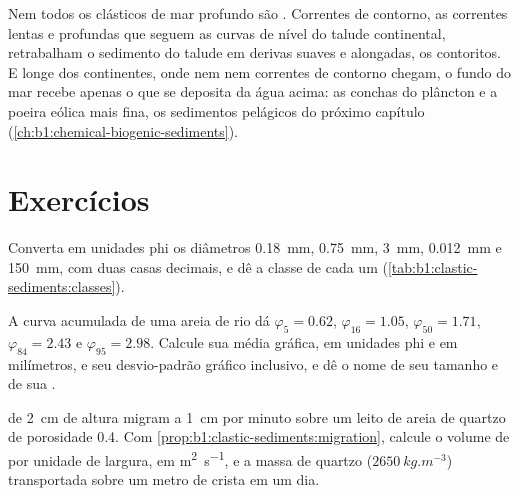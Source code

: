Nem todos os clásticos de mar profundo são . Correntes de contorno, as correntes lentas e profundas que seguem as curvas de nível do talude continental, retrabalham o sedimento do talude em derivas suaves e alongadas, os contoritos. E longe dos continentes, onde nem  nem correntes de contorno chegam, o fundo do mar recebe apenas o que se deposita da água acima: as conchas do plâncton e a poeira eólica mais fina, os sedimentos pelágicos do próximo capítulo (\cref{ch:b1:chemical-biogenic-sediments}).

\section{Exercícios}

\begin{exercise}[$\star$]\label{exo:b1:clastic-sediments:1}
Converta em unidades phi os diâmetros \qty{0.18}{mm}, \qty{0.75}{mm}, \qty{3}{mm}, \qty{0.012}{mm} e \qty{150}{mm}, com duas casas decimais, e dê a classe de cada um (\cref{tab:b1:clastic-sediments:classes}).
\end{exercise}

\begin{exercise}[$\star$]\label{exo:b1:clastic-sediments:2}
A curva acumulada de uma areia de rio dá $\varphi_5 = 0.62$, $\varphi_{16} =
1.05$, $\varphi_{50} = 1.71$, $\varphi_{84} = 2.43$ e $\varphi_{95} = 2.98$. Calcule sua média gráfica, em unidades phi e em milímetros, e seu desvio-padrão gráfico inclusivo, e dê o nome de seu tamanho e de sua .
\end{exercise}

\begin{exercise}[$\star$]\label{exo:b1:clastic-sediments:3}
 de \qty{2}{cm} de altura migram a \qty{1}{cm} por minuto sobre um leito de areia de quartzo de porosidade \num{0.4}. Com \cref{prop:b1:clastic-sediments:migration}, calcule o volume de  por unidade de largura, em \si{m^2.s^{-1}}, e a massa de quartzo ($\qty{2650}{kg.m^{-3}}$) transportada sobre um metro de crista em um dia.
\end{exercise}

